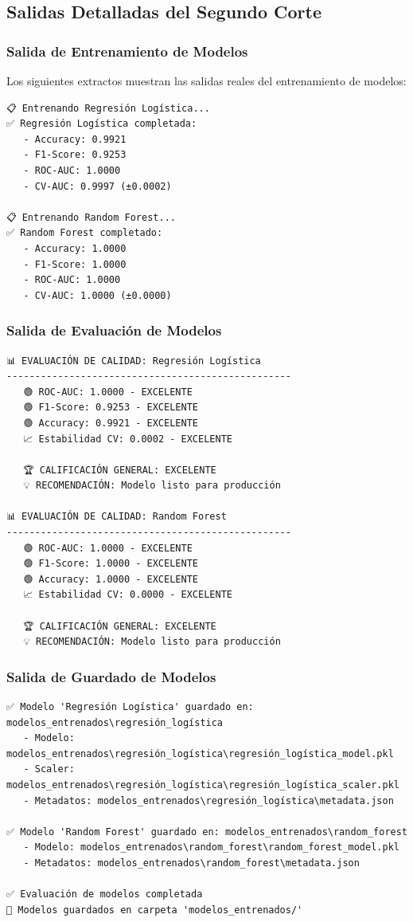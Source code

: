 \documentclass[12pt,letterpaper]{article}
\begin{document}
\subsection{Salidas Detalladas del Segundo Corte}

\subsubsection{Salida de Entrenamiento de Modelos}

Los siguientes extractos muestran las salidas reales del entrenamiento de modelos:

\begin{verbatim}
📋 Entrenando Regresión Logística...
✅ Regresión Logística completada:
   - Accuracy: 0.9921
   - F1-Score: 0.9253
   - ROC-AUC: 1.0000
   - CV-AUC: 0.9997 (±0.0002)

📋 Entrenando Random Forest...
✅ Random Forest completado:
   - Accuracy: 1.0000
   - F1-Score: 1.0000
   - ROC-AUC: 1.0000
   - CV-AUC: 1.0000 (±0.0000)
\end{verbatim}

\subsubsection{Salida de Evaluación de Modelos}

\begin{verbatim}
📊 EVALUACIÓN DE CALIDAD: Regresión Logística
--------------------------------------------------
   🟢 ROC-AUC: 1.0000 - EXCELENTE
   🟢 F1-Score: 0.9253 - EXCELENTE
   🟢 Accuracy: 0.9921 - EXCELENTE
   📈 Estabilidad CV: 0.0002 - EXCELENTE

   🏆 CALIFICACIÓN GENERAL: EXCELENTE
   💡 RECOMENDACIÓN: Modelo listo para producción

📊 EVALUACIÓN DE CALIDAD: Random Forest
--------------------------------------------------
   🟢 ROC-AUC: 1.0000 - EXCELENTE
   🟢 F1-Score: 1.0000 - EXCELENTE
   🟢 Accuracy: 1.0000 - EXCELENTE
   📈 Estabilidad CV: 0.0000 - EXCELENTE

   🏆 CALIFICACIÓN GENERAL: EXCELENTE
   💡 RECOMENDACIÓN: Modelo listo para producción
\end{verbatim}

\subsubsection{Salida de Guardado de Modelos}

\begin{verbatim}
✅ Modelo 'Regresión Logística' guardado en: modelos_entrenados\regresión_logística
   - Modelo: modelos_entrenados\regresión_logística\regresión_logística_model.pkl
   - Scaler: modelos_entrenados\regresión_logística\regresión_logística_scaler.pkl
   - Metadatos: modelos_entrenados\regresión_logística\metadata.json

✅ Modelo 'Random Forest' guardado en: modelos_entrenados\random_forest
   - Modelo: modelos_entrenados\random_forest\random_forest_model.pkl
   - Metadatos: modelos_entrenados\random_forest\metadata.json

✅ Evaluación de modelos completada
📁 Modelos guardados en carpeta 'modelos_entrenados/'
\end{verbatim}
\end{document}
